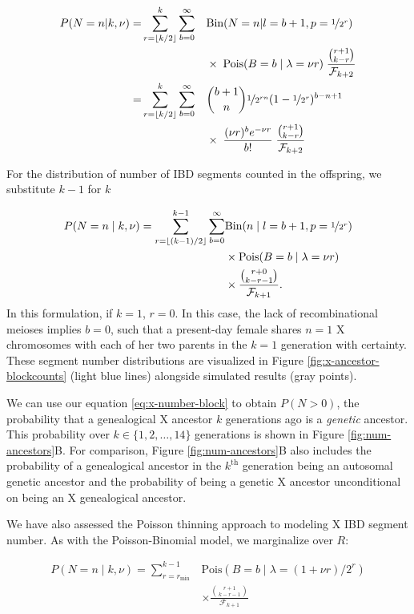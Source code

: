 \documentclass[9pt,twocolumn,twoside]{gsajnl}
\begin{document}
\begin{alignat*}
  P(N=n | k, \nu) =& \sum_{r=\lfloor k/2 \rfloor}^k \sum_{b=0}^\infty &&\text{Bin}(N=n | l=b+1, p=\nicefrac{1}{2^r}) \nonumber \\ 
  & &&\times \; \text{Pois}(B=b \;|\; \lambda=\nu r) \; \frac{{r+1 \choose k-r}}{\mathcal{F}_{k+2}} \nonumber \\
  =& \sum_{r=\lfloor k/2 \rfloor}^k \sum_{b=0}^\infty &&{b + 1 \choose n } \nicefrac{1}{2^{rn}}(1 - \nicefrac{1}{2^r})^{b - n + 1} \nonumber\\ 
  & && \times \; \frac{(\nu r)^b e^{-\nu r}}{b!} \; \frac{{r+1 \choose k-r}}{\mathcal{F}_{k+2}}
\end{alignat*}

For the distribution of number of IBD segments counted in the offspring, we
substitute $k-1$ for $k$

\begin{align}
  P(N=n \;|\; k, \nu) = \sum_{r=\lfloor (k-1)/2 \rfloor}^{k-1} \sum_{b=0}^\infty &\text{Bin}(n \;|\; l=b+1, p=\nicefrac{1}{2^r})  \nonumber \\& \times \text{Pois}(B=b \;|\; \lambda=\nu r) \; \nonumber \\ 
  & \times \frac{{r+0 \choose k-r-1}}{\mathcal{F}_{k+1}}.
  \label{eq:x-number-block}
\end{align}
%
In this formulation, if $k=1$, $r = 0$. In this case, the lack of
recombinational meioses implies $b=0$, such that a present-day female shares
$n=1$ X chromosomes with each of her two parents in the $k=1$ generation with
certainty. These segment number distributions are visualized in Figure
\ref{fig:x-ancestor-blockcounts} (light blue lines) alongside simulated results
(gray points).

We can use our equation \eqref{eq:x-number-block} to obtain $P(N > 0)$, the
probability that a genealogical X ancestor $k$ generations ago is a
\emph{genetic} ancestor. This probability over $k \in \{1, 2, \ldots, 14\}$
generations is shown in Figure \ref{fig:num-ancestors}B. For comparison, Figure
\ref{fig:num-ancestors}B also includes the probability of a genealogical
ancestor in the $k^\text{th}$ generation being an autosomal genetic ancestor
and the probability of being a genetic X ancestor unconditional on being an X
genealogical ancestor. 

We have also assessed the Poisson thinning approach to modeling X IBD segment
number. As with the Poisson-Binomial model, we marginalize over $R$:

\begin{align}
  P(N=n \;|\; k, \nu) = \sum_{r=r_\text{min}}^{k-1} 
  & \text{Pois}(B=b \;|\; \lambda=(1 + \nu r)/2^r) 
 \nonumber \\  &\times \frac{{r+1 \choose k-r-1}}{\mathcal{F}_{k+1}}
  \label{eq:x-number-block-thinned}
\end{align}
\end{document}
